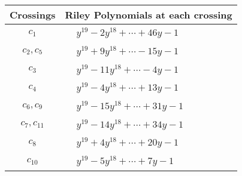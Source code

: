 \documentclass[1p]{elsarticle_modified}
\theoremstyle{definition}
\begin{document}
\begin{tabular}{m{50pt}|m{274pt}}
Crossings & \hspace{64pt}Riley Polynomials at each crossing \\
\hline $$\begin{aligned}c_{1}\end{aligned}$$&$\begin{aligned}
&y^{19}-2 y^{18}+\cdots+46 y-1
\end{aligned}$\\
\hline $$\begin{aligned}c_{2},c_{5}\end{aligned}$$&$\begin{aligned}
&y^{19}+9 y^{18}+\cdots-15 y-1
\end{aligned}$\\
\hline $$\begin{aligned}c_{3}\end{aligned}$$&$\begin{aligned}
&y^{19}-11 y^{18}+\cdots-4 y-1
\end{aligned}$\\
\hline $$\begin{aligned}c_{4}\end{aligned}$$&$\begin{aligned}
&y^{19}-4 y^{18}+\cdots+13 y-1
\end{aligned}$\\
\hline $$\begin{aligned}c_{6},c_{9}\end{aligned}$$&$\begin{aligned}
&y^{19}-15 y^{18}+\cdots+31 y-1
\end{aligned}$\\
\hline $$\begin{aligned}c_{7},c_{11}\end{aligned}$$&$\begin{aligned}
&y^{19}-14 y^{18}+\cdots+34 y-1
\end{aligned}$\\
\hline $$\begin{aligned}c_{8}\end{aligned}$$&$\begin{aligned}
&y^{19}+4 y^{18}+\cdots+20 y-1
\end{aligned}$\\
\hline $$\begin{aligned}c_{10}\end{aligned}$$&$\begin{aligned}
&y^{19}-5 y^{18}+\cdots+7 y-1
\end{aligned}$\\
\hline
\end{tabular}\\~\\
\end{document}

